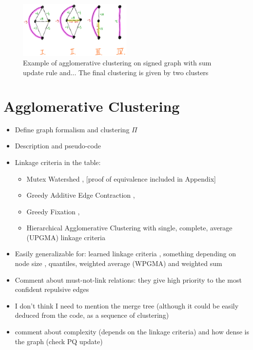 \documentclass[10pt,twocolumn,letterpaper]{article}
\begin{document}
\begin{algorithm}
\begin{algorithmic}[1]

  \end{algorithmic}
\end{algorithm}


\begin{figure}
\centering
\includegraphics[width=0.50\textwidth,trim=0.in 0.in 0.in 0.in,clip]{./figs/aggl_clust_with_nonlink.jpeg}
\caption{\small 
Example of agglomerative clustering on signed graph with sum update rule and... The final clustering is given by two clusters
\label{fig:example_non_unique_weights_1}}
\end{figure}




\section{Agglomerative Clustering}
\begin{itemize}
\item Define graph formalism and clustering $\Pi$
\item Description and pseudo-code
\item Linkage criteria in the table:
\begin{itemize}
\item Mutex Watershed \cite{wolf2018mutex}, [proof of equivalence included in Appendix]
\item Greedy Additive Edge Contraction \cite{levinkov2017comparative}, 
\item Greedy Fixation \cite{levinkov2017comparative}, 
\item Hierarchical Agglomerative Clustering with single, complete, average (UPGMA) linkage criteria
\end{itemize}
\item Easily generalizable for: learned linkage criteria \cite{nunez2013machine}, something depending on node size \cite{felzenszwalb2004efficient}, quantiles, weighted average (WPGMA) and weighted sum

\item Comment about must-not-link relations: they give high priority to the most confident repulsive edges 
\item I don't think I need to mention the merge tree (although it could be easily deduced from the code, as a sequence of clustering)
\item comment about complexity (depends on the linkage criteria) and how dense is the graph (check PQ update)
\end{itemize}
\end{document}
